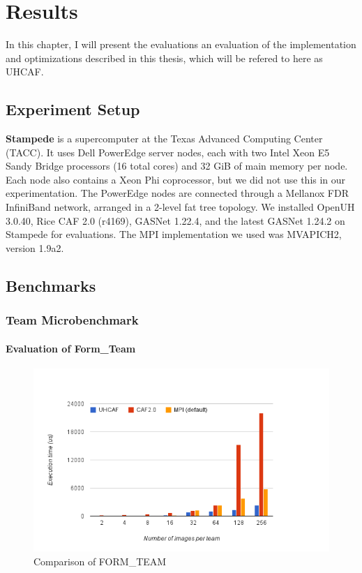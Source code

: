\chapter{Results}\label{chap:Results}
In this chapter, I will present the evaluations an evaluation of the implementation and optimizations described in this thesis, which will be refered to here as UHCAF.

\section{Experiment Setup}
\textbf{Stampede} is a supercomputer at the Texas Advanced Computing Center
(TACC). It uses Dell PowerEdge server nodes, each with two Intel Xeon E5 Sandy
Bridge processors (16 total cores) and 32 GiB of main memory per node. Each
node also contains a Xeon Phi coprocessor, but we did not use this in our
experimentation. The PowerEdge nodes are connected through a Mellanox FDR
InfiniBand network, arranged in a 2-level fat tree topology. 
We installed OpenUH 3.0.40, Rice CAF 2.0 (r4169), GASNet 1.22.4, and the
latest GASNet 1.24.2 on Stampede for evaluations. The MPI implementation we used was MVAPICH2, version 1.9a2.

\section{Benchmarks}
\subsection{Team Microbenchmark}
\subsubsection{Evaluation of Form\_Team}
\begin{figure}[h]
  \centering
  \includegraphics[width=\columnwidth]{figures/form-team.png}
  \caption{Comparison of FORM\_TEAM}
  \label{fig:form-team}
\end{figure}
